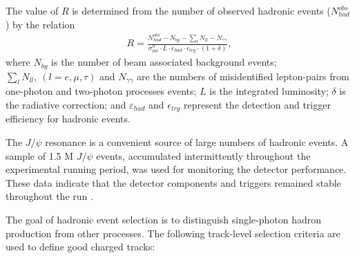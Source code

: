 
The value of $R$ is determined from the number of observed hadronic events
($N^{obs}_{had}$) by the relation
\begin{eqnarray*}
R=\frac{ N^{obs}_{had} - N_{bg} - \sum_{l}N_{ll} - N_{\gamma\gamma} }
{ \sigma^0_{\mu\mu} \cdot L \cdot \epsilon_{had} \cdot \epsilon_{trg}
\cdot (1+\delta)}, 
\end{eqnarray*}
where $N_{bg}$ is the number of beam associated background events;
$\sum_{l}N_{ll},~(l=e,\mu,\tau)$ and $N_{\gamma\gamma}$ are the
numbers of misidentified 
lepton-pairs from one-photon and two-photon processes events; $L$ is
the integrated luminosity; $\delta$ is the
radiative correction; and $\varepsilon_{had}$ and
$\epsilon_{trg}$ represent the detection and trigger efficiency for
hadronic events.


The $J/\psi$ resonance is a convenient source of large numbers of
hadronic events.  A sample of 1.5 M 
$J/\psi$ events, accumulated intermittently throughout the
experimental running period, was used for monitoring the
detector performance.
These data indicate that the detector components and
triggers remained stable throughout the run \cite{Vancouver}.


The goal of hadronic event selection is to distinguish single-photon
hadron production from other processes.  The following track-level
selection criteria are used to define good charged tracks:

